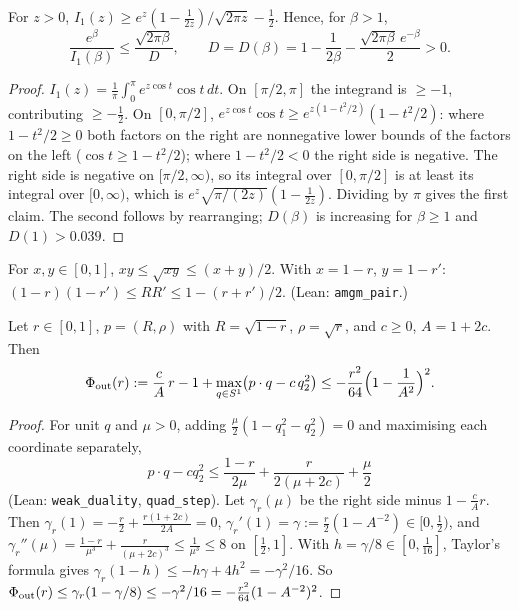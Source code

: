 \begin{lemma}\label{tu:U-I1}
For $z>0$, $I_1(z)\ge e^z(1-\frac1{2z})/\sqrt{2\pi z}-\frac12$. Hence, for $\beta>1$,
\[
\frac{e^\beta}{I_1(\beta)}\le\frac{\sqrt{2\pi\beta}}{D},\qquad D=D(\beta)=1-\frac1{2\beta}-\frac{\sqrt{2\pi\beta}\,e^{-\beta}}2>0 .
\]
\end{lemma}

\begin{proof}
$I_1(z)=\frac1\pi\int_0^\pi e^{z\cos t}\cos t\,dt$. On $[\pi/2,\pi]$ the integrand is $\ge-1$, contributing $\ge-\frac12$. On
$[0,\pi/2]$, $e^{z\cos t}\cos t\ge e^{z(1-t^2/2)}(1-t^2/2)$: where $1-t^2/2\ge0$ both factors on the right are
nonnegative lower bounds of the factors on the left ($\cos t\ge1-t^2/2$); where $1-t^2/2<0$ the right side is
negative. The right side is negative on $[\pi/2,\infty)$, so its integral over $[0,\pi/2]$ is at least its integral
over $[0,\infty)$, which is $e^z\sqrt{\pi/(2z)}(1-\frac1{2z})$. Dividing by $\pi$ gives the first claim. The second follows
by rearranging; $D(\beta)$ is increasing for $\beta\ge1$ and $D(1)>0.039$.
\end{proof}

\begin{lemma}[AM--GM]\label{tu:U-amgm}
For $x,y\in[0,1]$, $xy\le\sqrt{xy}\le(x+y)/2$. With $x=1-r$, $y=1-r'$:
$(1-r)(1-r')\le RR'\le1-(r+r')/2$. (Lean: \texttt{amgm\_pair}.)
\end{lemma}

\begin{lemma}\label{tu:U-outer}
Let $r\in[0,1]$, $p=(R,\rho)$ with $R=\sqrt{1-r}$, $\rho=\sqrt r$, and $c\ge0$, $A=1+2c$. Then
\[
\Phi_{\rm out}(r):=\frac cA\,r-1+\max_{q\in S^1}\bigl(p\cdot q-c\,q_2^2\bigr)\le-\frac{r^2}{64}\Bigl(1-\frac1{A^2}\Bigr)^2 .
\]
\end{lemma}

\begin{proof}
For unit $q$ and $\mu>0$, adding $\frac\mu2(1-q_1^2-q_2^2)=0$ and maximising each coordinate separately,
\[
p\cdot q-cq_2^2\le\frac{1-r}{2\mu}+\frac{r}{2(\mu+2c)}+\frac\mu2
\]
(Lean: \texttt{weak\_duality}, \texttt{quad\_step}). Let $\gamma_r(\mu)$ be the right side minus $1-\frac cAr$. Then
$\gamma_r(1)=-\frac r2+\frac{r(1+2c)}{2A}=0$, $\gamma_r'(1)=\gamma:=\frac r2(1-A^{-2})\in[0,\frac12)$, and
$\gamma_r''(\mu)=\frac{1-r}{\mu^3}+\frac{r}{(\mu+2c)^3}\le\frac1{\mu^3}\le8$ on $[\frac12,1]$. With $h=\gamma/8\in[0,\frac1{16}]$,
Taylor's formula gives $\gamma_r(1-h)\le-h\gamma+4h^2=-\gamma^2/16$. So
$\Phi_{\rm out}(r)\le\gamma_r(1-\gamma/8)\le-\gamma^2/16=-\frac{r^2}{64}(1-A^{-2})^2$.
\end{proof}

